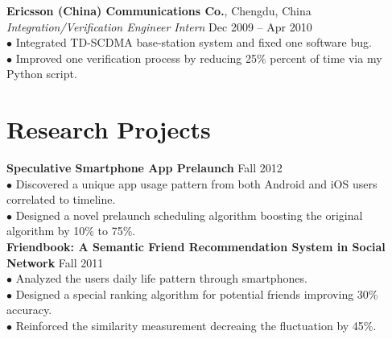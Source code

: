 \documentclass[margin, centered]{resume}
\begin{document}
\begin{resume}
    \textbf{Ericsson (China) Communications Co.}, Chengdu, China \vspace{0mm}\\%
	\emph{Integration/Verification Engineer Intern} \hfill Dec 2009 -- Apr 2010\vspace{0mm}\\
    $\bullet$ Integrated TD-SCDMA base-station system and fixed one software bug.\vspace{0mm}\\
    $\bullet$ Improved one verification process by reducing 25\% percent of time via my Python script.\vspace{-1mm}\\


    \section{\mysidestyle Research Projects}
	
	\textbf{Speculative Smartphone App Prelaunch} \hfill Fall 2012\\
	$\bullet$ Discovered a unique app usage pattern from both Android and iOS users correlated to timeline.\vspace{0mm}\\%
	$\bullet$ Designed a novel prelaunch scheduling algorithm boosting the original algorithm by 10\% to 75\%.\vspace{3mm}\\%
	\textbf{Friendbook: A Semantic Friend Recommendation System in Social Network} \hfill Fall 2011\\
	$\bullet$ Analyzed the users daily life pattern through smartphones.  \vspace{0mm}\\%
	$\bullet$ Designed a special ranking algorithm for potential friends improving 30\% accuracy. \vspace{0mm}\\%
	$\bullet$ Reinforced the similarity measurement decreaing the fluctuation by 45\%.\vspace{1mm}\\


\end{resume}
\end{document}
